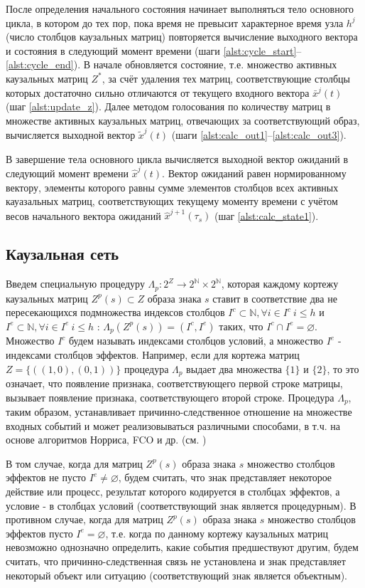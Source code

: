 \documentclass[12pt]{scrartcl}
\begin{document}
	После определения начального состояния начинает выполняться тело основного цикла, в котором до тех пор, пока время не превысит характерное время узла $h^j$ (число столбцов каузальных матриц) повторяется вычисление выходного вектора и состояния в следующий момент времени (шаги \ref{alst:cycle_start}--\ref{alst:cycle_end}). В начале обновляется состояние, т.е. множество активных каузальных матриц $Z^*$, за счёт удаления тех матриц, соответствующие столбцы которых достаточно сильно отличаются от текущего входного вектора $\bar x^j(t)$ (шаг \ref{alst:update_z}). Далее методом голосования по количеству матриц в множестве активных каузальных матриц, отвечающих за соответствующий образ, вычисляется выходной вектор $\tilde x^j(t)$ (шаги \ref{alst:calc_out1}--\ref{alst:calc_out3}).

	В завершение тела основного цикла вычисляется выходной вектор ожиданий в следующий момент времени $\hat x^j(t)$. Вектор ожиданий равен нормированному вектору, элементы которого равны сумме элементов столбцов всех активных кауазальных матриц, соответствующих текущему моменту времени с учётом весов начального вектора ожиданий $\hat x^{j+1}(\tau_s)$ (шаг \ref{alst:calc_state1}).

	\subsection{Каузальная сеть}
	
	Введем специальную процедуру $\Lambda_p: 2^Z\rightarrow 2^{\mathbb N}\times 2^{\mathbb N}$, которая каждому кортежу каузальных матриц $Z^p(s)\subset Z$ образа знака $s$ ставит в соответствие два не пересекающихся подмножества индексов столбцов $I^c\subset\mathbb N, \forall i\in I^c\ i\leq h$ и $I^e\subset\mathbb N, \forall i\in I^e\ i\leq h$ : $\Lambda_p(Z^p(s))=(I^c,I^e)$ таких, что $I^c\cap I^e=\varnothing$. Множество $I^c$ будем называть индексами столбцов условий, а множество $I^e$ - индексами столбцов эффектов. Например, если для кортежа матриц $Z=\{((1, 0), (0, 1))\}$ процедура $\Lambda_p$ выдает два множества $\{1\}$ и $\{2\}$, то это означает, что появление признака, соответствующего первой строке матрицы, вызывает появление признака, соответствующего второй строке. Процедура $\Lambda_p$, таким образом, устанавливает причинно-следственное отношение на множестве входных событий и может реализовываться различными способами, в т.ч. на основе алгоритмов Норриса, FCO и др. (см. \cite{Kuznetsov2001})
	

	В том случае, когда для матриц $Z^p(s)$ образа знака $s$ множество столбцов эффектов не пусто $I^e \not=\varnothing$, будем считать, что знак представляет некоторое действие или процесс, результат которого кодируется в столбцах эффектов, а условие - в столбцах условий (соответствующий знак является процедурным). В противном случае, когда для матриц $Z^p(s)$ образа знака $s$ множество столбцов эффектов пусто $I^e=\varnothing$, т.е. когда по данному кортежу каузальных матриц невозможно однозначно определить, какие события предшествуют другим, будем считать, что причинно-следственная связь не установлена и знак представляет некоторый объект или ситуацию (соответствующий знак является объектным). 
\end{document}
